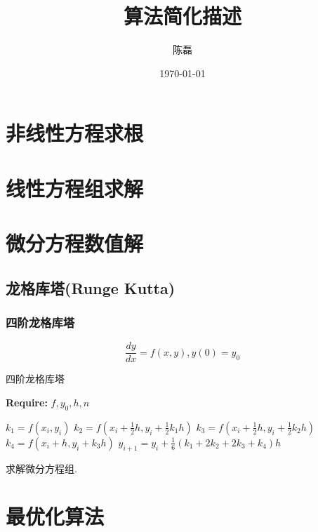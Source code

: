 \documentclass[a4paper,11pt,oneside]{book}
\begin{document}
\title{算法简化描述}
\author{陈磊}
\date{\today}

\maketitle
\frontmatter

\tableofcontents
\listofalgorithms

\mainmatter

\chapter{非线性方程求根}

\chapter{线性方程组求解}

\chapter{微分方程数值解}

\section{龙格库塔(Runge Kutta)}
\subsection{四阶龙格库塔}
\begin{equation}
	\frac{dy}{dx}=f(x,y), y(0)=y_0
\end{equation}

\begin{algorithm}
\caption{四阶龙格库塔} %
{\bf Require:} $f, y_0, h, n$
\begin{algorithmic}[1]
	\State $k_1=f(x_i,y_i)$
	\State $k_2=f(x_i+\frac{1}{2}h,y_i+\frac{1}{2}k_1h)$
	\State $k_3=f(x_i+\frac{1}{2}h,y_i+\frac{1}{2}k_2h)$
	\State $k_4=f(x_i+h,y_i+k_3h)$
	\State $y_{i+1} = y_i + \frac{1}{6}(k_1+2k_2+2k_3+k_4)h$
\EndFor
\end{algorithmic}
\end{algorithm}

求解微分方程组.



\chapter{最优化算法}
\end{document}
